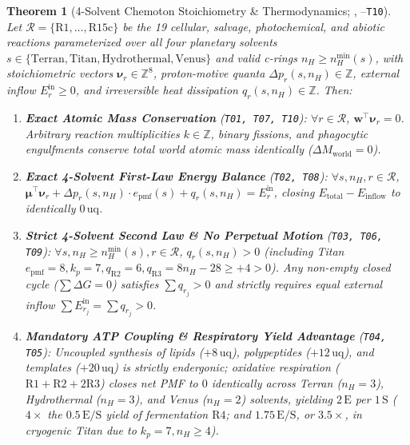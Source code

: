 \documentclass[11pt,reqno]{amsart}
\theoremstyle{plain}
\newtheorem{theorem}{Theorem}[section]
\theoremstyle{definition}
\theoremstyle{remark}
\newcommand{\tcode}[1]{{\scriptsize\nolinkurl{#1}}}
\begin{document}
\begin{theorem}[4-Solvent Chemoton Stoichiometry \& Thermodynamics; {\normalfont\tcode{StoichiometryThermo.lean}}, {\normalfont\tcode{T01}--\tcode{T10}}]
\label{thm:chemoton}
Let $\mathcal{R} = \{\mathrm{R1}, \dots, \mathrm{R15c}\}$ be the 19 cellular, salvage, photochemical, and abiotic reactions parameterized over all four planetary solvents $s \in \{\mathrm{Terran}, \mathrm{Titan}, \mathrm{Hydrothermal}, \mathrm{Venus}\}$ and valid c-rings $n_H \ge n_H^{\min}(s)$, with stoichiometric vectors $\boldsymbol{\nu}_r \in \mathbb{Z}^8$, proton-motive quanta $\Delta p_r(s, n_H) \in \mathbb{Z}$, external inflow $E_r^{\mathrm{in}} \ge 0$, and irreversible heat dissipation $q_r(s, n_H) \in \mathbb{Z}$. Then:
\begin{enumerate}[leftmargin=1.8em, itemsep=1.5pt]
  \item \textbf{Exact Atomic Mass Conservation} (\textup{\texttt{T01, T07, T10}}): $\forall r \in \mathcal{R}$, $\mathbf{w}^\top \boldsymbol{\nu}_r = 0$. Arbitrary reaction multiplicities $k \in \mathbb{Z}$, binary fissions, and phagocytic engulfments conserve total world atomic mass identically ($\Delta M_{\mathrm{world}} = 0$).
  \item \textbf{Exact 4-Solvent First-Law Energy Balance} (\textup{\texttt{T02, T08}}): $\forall s, n_H, r \in \mathcal{R}$, $\boldsymbol{\mu}^\top \boldsymbol{\nu}_r + \Delta p_r(s, n_H) \cdot e_{\mathrm{pmf}}(s) + q_r(s, n_H) = E_r^{\mathrm{in}}$, closing $E_{\mathrm{total}} - E_{\mathrm{inflow}}$ to identically $0\,\mathrm{uq}$.
  \item \textbf{Strict 4-Solvent Second Law \& No Perpetual Motion} (\textup{\texttt{T03, T06, T09}}): $\forall s, n_H \ge n_H^{\min}(s), r \in \mathcal{R}$, $q_r(s, n_H) > 0$ (including Titan $e_{\mathrm{pmf}}=8, k_p=7, q_{\mathrm{R2}}=6, q_{\mathrm{R3}} = 8 n_H - 28 \ge +4 > 0$). Any non-empty closed cycle ($\sum \Delta G = 0$) satisfies $\sum q_{r_j} > 0$ and strictly requires equal external inflow $\sum E_{r_j}^{\mathrm{in}} = \sum q_{r_j} > 0$.
  \item \textbf{Mandatory ATP Coupling \& Respiratory Yield Advantage} (\textup{\texttt{T04, T05}}): Uncoupled synthesis of lipids ($+8\,\mathrm{uq}$), polypeptides ($+12\,\mathrm{uq}$), and templates ($+20\,\mathrm{uq}$) is strictly endergonic; oxidative respiration ($\mathrm{R1}+\mathrm{R2}+2\mathrm{R3}$) closes net PMF to $0$ identically across Terran ($n_H=3$), Hydrothermal ($n_H=3$), and Venus ($n_H=2$) solvents, yielding $2\,\mathrm{E}$ per $1\,\mathrm{S}$ ($4\times$ the $0.5\,\mathrm{E}/\mathrm{S}$ yield of fermentation $\mathrm{R4}$; and $1.75\,\mathrm{E}/\mathrm{S}$, or $3.5\times$, in cryogenic Titan due to $k_p=7, n_H \ge 4$).
\end{enumerate}
\end{theorem}
\end{document}
